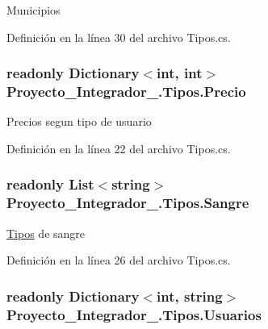 Municipios 



Definición en la línea 30 del archivo Tipos.\-cs.

\hypertarget{class_proyecto___integrador__3_1_1_tipos_afe593c0c3c57dd7bf5133d57974f1ed3}{
\subsubsection[{Precio}]{\setlength{\rightskip}{0pt plus 5cm}readonly Dictionary$<$int, int$>$ Proyecto\-\_\-\-Integrador\-\_.\-Tipos.\-Precio\hspace{0.3cm}{\ttfamily [static]}}}\label{class_proyecto___integrador__3_1_1_tipos_afe593c0c3c57dd7bf5133d57974f1ed3}


Precios segun tipo de usuario 



Definición en la línea 22 del archivo Tipos.\-cs.

\hypertarget{class_proyecto___integrador__3_1_1_tipos_a25b8a490a180214246eedb322ed962a2}{
\subsubsection[{Sangre}]{\setlength{\rightskip}{0pt plus 5cm}readonly List$<$string$>$ Proyecto\-\_\-\-Integrador\-\_.\-Tipos.\-Sangre\hspace{0.3cm}{\ttfamily [static]}}}\label{class_proyecto___integrador__3_1_1_tipos_a25b8a490a180214246eedb322ed962a2}


\hyperlink{class_proyecto___integrador__3_1_1_tipos}{Tipos} de sangre 



Definición en la línea 26 del archivo Tipos.\-cs.

\hypertarget{class_proyecto___integrador__3_1_1_tipos_ae053b8caca38c487e2d9d2635b154c88}{
\subsubsection[{Usuarios}]{\setlength{\rightskip}{0pt plus 5cm}readonly Dictionary$<$int, string$>$ Proyecto\-\_\-\-Integrador\-\_.\-Tipos.\-Usuarios\hspace{0.3cm}{\ttfamily [static]}}}\label{class_proyecto___integrador__3_1_1_tipos_ae053b8caca38c487e2d9d2635b154c88}


